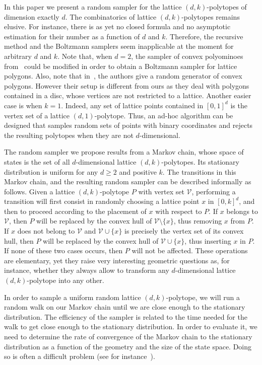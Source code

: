 \documentclass[a4paper]{article}
\begin{document}
In this paper we present a random sampler for the lattice $(d,k)$-polytopes of dimension exactly $d$. The combinatorics of lattice $(d,k)$-polytopes remains elusive. For instance, there is as yet no closed formula and no asymptotic estimation for their number as a function of $d$ and $k$. Therefore, the recursive method and the Boltzmann samplers seem inapplicable at the moment for arbitrary $d$ and $k$. Note that, when $d=2$, the sampler of convex polyominoes from~\cite{bodini2013asymptotic} could be modified in order to obtain a Boltzmann sampler for lattice polygons. Also, note that in~\cite{devillers2014generator}, the authors give a random generator of convex polygons. However their setup is different from ours as they deal with polygons contained in a disc, whose vertices are not restricted to a lattice. Another easier case is when $k=1$. Indeed, any set of lattice points contained in $[0,1]^d$ is the vertex set of a lattice $(d,1)$-polytope. Thus, an ad-hoc algorithm can be designed that samples random sets of points with binary coordinates and rejects the resulting polytopes when they are not $d$-dimensional.

The random sampler we propose results from a Markov chain, whose space of states is the set of all $d$-dimensional lattice $(d,k)$-polytopes. Its stationary distribution is uniform for any $d\geq{2}$ and positive $k$. The transitions in this Markov chain, and the resulting random sampler can be described informally as follows. Given a lattice $(d,k)$-polytope $P$ with vertex set $\mathcal{V}$, performing a transition will first consist in randomly choosing a lattice point $x$ in $[0,k]^d$, and then to proceed according to the placement of $x$ with respect to $P$. If $x$ belongs to $\mathcal{V}$, then $P$ will be replaced by the convex hull of $\mathcal{V}\mathord{\setminus}\{x\}$, thus removing $x$ from $P$. If $x$ does not belong to $\mathcal{V}$ and $\mathcal{V}\cup\{x\}$
is precisely the vertex set of its convex hull, then $P$ will be replaced by the convex hull of $\mathcal{V}\cup\{x\}$, thus inserting $x$ in $P$. If none of these two cases occurs, then $P$ will not be affected. These operations are elementary, yet they raise very interesting geometric questions as, for instance, whether they always allow to transform any $d$-dimensional lattice $(d,k)$-polytope into any other.

In order to sample a uniform random lattice $(d,k)$-polytope, we will run a random walk on our Markov chain until we are close enough to the stationary distribution. The efficiency of the sampler is related to the time needed for the walk to get close enough to the stationary distribution. In order to evaluate it, we need to determine the rate of convergence of the Markov chain to the stationary distribution as a function of the geometry and the size of the state space. Doing so is often a difficult problem (see for instance~\cite{carnino2011random,melanccon2001random}).
\end{document}
